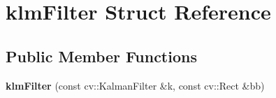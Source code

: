 \hypertarget{structklmFilter}{}\section{klm\+Filter Struct Reference}
\label{structklmFilter}
\subsection*{Public Member Functions}
\begin{DoxyCompactItemize}
\item 
{\bfseries klm\+Filter} (const cv\+::\+Kalman\+Filter \&k, const cv\+::\+Rect \&bb)\hypertarget{structklmFilter_ac0bb918220e5d4a7f5009ccfe2bb7f30}{}\label{structklmFilter_ac0bb918220e5d4a7f5009ccfe2bb7f30}

\end{DoxyCompactItemize}
